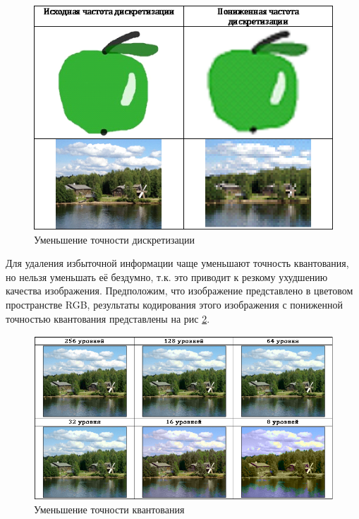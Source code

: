 \begin{figure}[H]
	\begin{center}
		\includegraphics[scale=0.9]{pics/quantization/discretization.png}
		\caption{Уменьшение точности дискретизации} 
		\label{pic:discretization}
	\end{center}
\end{figure}
Для удаления избыточной информации чаще уменьшают точность квантования, но нельзя уменьшать её бездумно, т.к. это приводит к резкому ухудшению качества изображения. Предположим, что изображение представлено в цветовом пространстве RGB, результаты кодирования этого изображения с пониженной точностью квантования представлены на рис \ref{pic:levels_of_quantization}.
\begin{figure}[H]
	\begin{center}
		\includegraphics[scale=0.85]{pics/quantization/levels_of_quantization.png}
		\caption{Уменьшение точности квантования} 
		\label{pic:levels_of_quantization}
	\end{center}
\end{figure}
